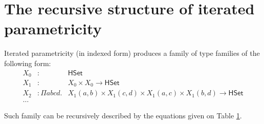 \documentclass[a4paper,english,cleveref,autoref,thm-restate]{article}
\newcommand{\U}{\ensuremath{\mathsf{{HSet}}}}
\begin{document}
\section{The recursive structure of iterated parametricity}

Iterated parametricity (in indexed form) produces a family of type
families of the following form:
\begin{equation*}
  \begin{array}{llr}
    X_0 & :              & \U                                                                        \\
    X_1 & :              & X_0 \times X_0 \rightarrow  \U                                            \\
    X_2 & : \Pi a b c d. & X_1(a,b) \times X_1 (c,d) \times X_1(a,c) \times X_1 (b,d) \rightarrow \U \\
    \ldots
  \end{array}
\end{equation*}

Such family can be recursively described by the equations given on Table \ref{}.
\end{document}
